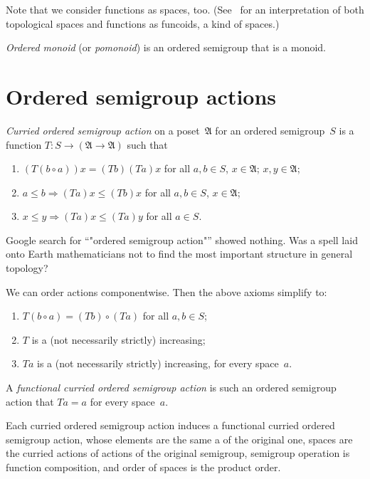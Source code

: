 Note that we consider functions as spaces, too. (See~\cite{volume-1} for an interpretation of both topological spaces and functions as funcoids, a kind of spaces.)

\begin{defn}
\emph{Ordered monoid} (or \emph{pomonoid}) is an ordered semigroup that is a monoid.
\end{defn}

\section{Ordered semigroup actions}

\begin{defn}
\emph{Curried ordered semigroup action} on a poset~$\mathfrak{A}$ for an ordered semigroup~$S$ is a function $T:S\to(\mathfrak{A}\to\mathfrak{A})$ such that
\begin{enumerate}
\item $(T(b\circ a))x = (Tb)(Ta)x$ for all $a,b\in S$, $x\in\mathfrak{A}$;
$x,y\in\mathfrak{A}$;
\item $a\leq b\Rightarrow(Ta)x\leq (Tb)x$ for all $a,b\in S$, $x\in\mathfrak{A}$;
\item $x\leq y\Rightarrow(Ta)x\leq (Ta)y$ for all $a\in S$. \end{enumerate}
\end{defn}

\begin{rem}
Google search for ``"ordered semigroup action"'' showed nothing. Was a spell laid onto Earth mathematicians not to find the most important structure in general topology?
\end{rem}

We can order actions componentwise. Then the above axioms simplify to:
\begin{enumerate}
\item $T(b\circ a) = (Tb)\circ(Ta)$ for all $a,b\in S$;
\item $T$ is a (not necessarily strictly) increasing;
\item $Ta$ is a (not necessarily strictly) increasing, for every space~$a$.
\end{enumerate}

\begin{defn}
A \emph{functional curried ordered semigroup action} is such an ordered semigroup action that $Ta=a$ for every space~$a$.
\end{defn}

\begin{thm}
Each curried ordered semigroup action induces a functional curried ordered semigroup action, whose elements are the same a of the original one, spaces are the curried actions of actions of the original semigroup, semigroup operation is function composition, and order of spaces is the product order.
\end{thm}


